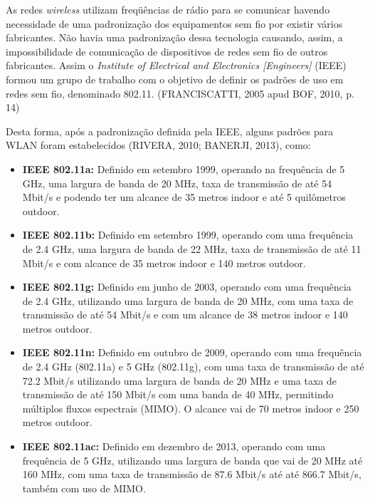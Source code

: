 \documentclass[
	12pt,				%
	openright,			%
	twoside,			%
	a4paper,			%
	english,			%
	french,				%
	spanish,			%
	brazil				%
	]{abntex2}
\begin{document}
\begin{citacao}
	As redes \textit{wireless} utilizam freqüências de rádio para se comunicar havendo necessidade de uma padronização dos equipamentos sem fio por existir vários fabricantes. Não havia uma padronização dessa tecnologia causando, assim, a impossibilidade de comunicação de dispositivos de redes sem fio de outros fabricantes. Assim o \textit{Institute of Electrical and Electronics [Engineers]} (IEEE) formou um grupo de trabalho com o objetivo de definir os padrões de uso em redes sem fio, denominado 802.11. (FRANCISCATTI, 2005 apud BOF, 2010, p. 14)
\end{citacao}

Desta forma, após a padronização definida pela IEEE, alguns padrões para WLAN foram estabelecidos (RIVERA, 2010; BANERJI, 2013), como:

\begin{itemize}
	\item \textbf{IEEE 802.11a:} Definido em setembro 1999, operando na frequência de 5 GHz, uma largura de banda de 20 MHz, taxa de transmissão de até 54 Mbit/s e podendo ter um alcance de 35 metros indoor e até 5 quilômetros outdoor.
	
	\item \textbf{IEEE 802.11b:} Definido em setembro 1999, operando com uma frequência de 2.4 GHz, uma largura de banda de 22 MHz, taxa de transmissão de até 11 Mbit/s e com alcance de 35 metros indoor e 140 metros outdoor.
	
	\item \textbf{IEEE 802.11g:} Definido em junho de 2003, operando com uma frequência de 2.4 GHz, utilizando uma largura de banda de 20 MHz, com uma taxa de transmissão de até 54 Mbit/s e com um alcance de 38 metros indoor e 140 metros outdoor.
	
	\item \textbf{IEEE 802.11n:} Definido em outubro de 2009, operando com uma frequência de 2.4 GHz (802.11a) e 5 GHz (802.11g), com uma taxa de transmissão de até 72.2 Mbit/s utilizando uma largura de banda de 20 MHz e uma taxa de transmissão de até 150 Mbit/s com uma banda de 40 MHz, permitindo múltiplos fluxos espectrais (MIMO). O alcance vai de 70 metros indoor e 250 metros outdoor.
	
	\item \textbf{IEEE 802.11ac:} Definido em dezembro de 2013, operando com uma frequência de 5 GHz, utilizando uma largura de banda que vai de 20 MHz até 160 MHz, com uma taxa de transmissão de 87.6 Mbit/s até até 866.7 Mbit/s, também com uso de MIMO. 
\end{itemize}
\end{document}
